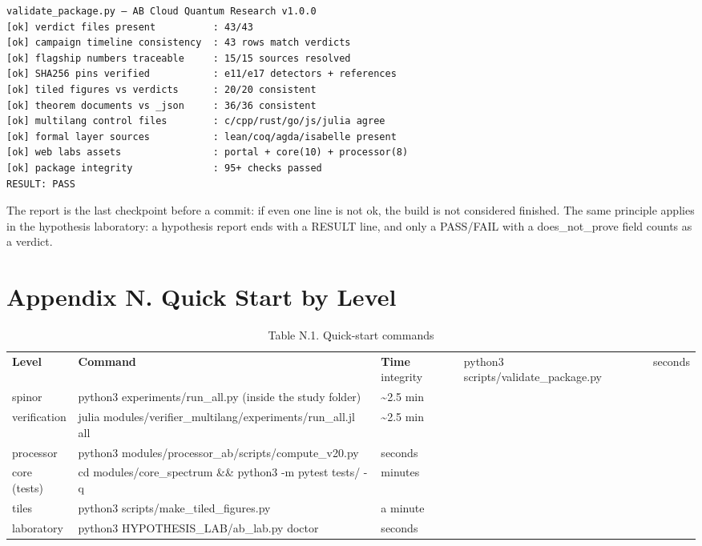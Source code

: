 \documentclass[11pt,a4paper]{article}
\begin{document}
\begin{verbatim}
validate_package.py — AB Cloud Quantum Research v1.0.0
[ok] verdict files present          : 43/43
[ok] campaign timeline consistency  : 43 rows match verdicts
[ok] flagship numbers traceable     : 15/15 sources resolved
[ok] SHA256 pins verified           : e11/e17 detectors + references
[ok] tiled figures vs verdicts      : 20/20 consistent
[ok] theorem documents vs _json     : 36/36 consistent
[ok] multilang control files        : c/cpp/rust/go/js/julia agree
[ok] formal layer sources           : lean/coq/agda/isabelle present
[ok] web labs assets                : portal + core(10) + processor(8)
[ok] package integrity              : 95+ checks passed
RESULT: PASS
\end{verbatim}

The report is the last checkpoint before a commit: if even one line is not ok, the build is not considered finished. The same principle applies in the hypothesis laboratory: a hypothesis report ends with a RESULT line, and only a PASS/FAIL with a does\_not\_prove field counts as a verdict.

\section{Appendix N. Quick Start by Level}

\begin{table}[htbp]\centering\small
\caption{Table N.1. Quick-start commands}
\begin{tabular}{p{} p{} p{}}
\toprule
\textbf{Level} & \textbf{Command} & \textbf{Time}
\midrule
integrity & python3 scripts/validate\_package.py & seconds \\
spinor & python3 experiments/run\_all.py (inside the study folder) & \textasciitilde{}2.5 min \\
verification & julia modules/verifier\_multilang/experiments/run\_all.jl all & \textasciitilde{}2.5 min \\
processor & python3 modules/processor\_ab/scripts/compute\_v20.py & seconds \\
core (tests) & cd modules/core\_spectrum \&\& python3 -m pytest tests/ -q & minutes \\
tiles & python3 scripts/make\_tiled\_figures.py & a minute \\
laboratory & python3 HYPOTHESIS\_LAB/ab\_lab.py doctor & seconds \\
\bottomrule
\end{tabular}
\end{table}
\end{document}
